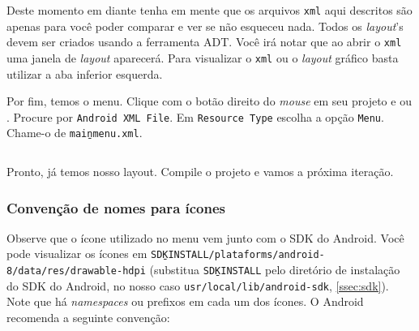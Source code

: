 \begin{listing}[H]
  \inputminted[linenos=true,frame=bottomline,tabsize=3]{ xml }{ source/main-1.xml }
  \caption{Layout principal [res/layout/main.xml]}
\end{listing}

Deste momento em diante tenha em mente que os arquivos \texttt{\gls{xml}} aqui descritos são apenas para
você poder comparar e ver se não esqueceu nada. Todos os \textit{layout}'s devem ser criados usando a
ferramenta ADT. Você irá notar que ao abrir o \texttt{xml} uma janela de \textit{layout} aparecerá.
Para visualizar o \texttt{xml} ou o \textit{layout} gráfico basta utilizar a aba inferior esquerda.

Por fim, temos o menu. Clique com o botão direito do \textit{mouse} em seu projeto e  ou . Procure por \texttt{Android XML File}. Em \texttt{Resource
Type} escolha a opção \texttt{Menu}. Chame-o de \texttt{main\b{ }menu.xml}.

\begin{listing}[H]
  \inputminted[linenos=true,frame=bottomline,tabsize=3]{ xml }{ source/main_menu-1.xml }
  \caption{Menu principal [res/menu/main\b{ }menu.xml]}
\end{listing}

Pronto, já temos nosso layout. Compile o projeto e vamos a próxima iteração.

\subsubsection{Convenção de nomes para ícones}

Observe que o ícone utilizado no menu vem junto com o SDK do Android. Você pode visualizar os
ícones em \texttt{SDK\b{ }INSTALL/plataforms/android-8/data/res/drawable-hdpi}
(substitua \texttt{SDK\b{ }INSTALL} pelo diretório de instalação do SDK do Android, no nosso caso
\texttt{usr/local/lib/android-sdk}, \ref{ssec:sdk}). Note que há \textit{namespaces} ou prefixos em
cada um dos ícones. O Android recomenda a seguinte convenção:

